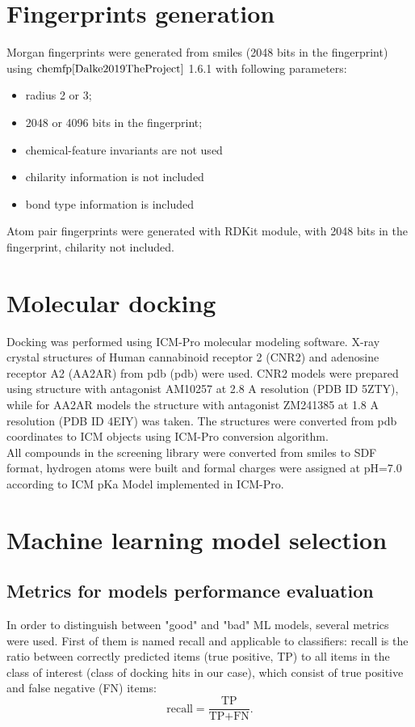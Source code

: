 \section{Fingerprints generation}

Morgan fingerprints were generated from \acrshort{smiles} (2048 bits in the fingerprint) 
using $\text{chemfp}{\cite{Dalke2019TheProject}}$ 1.6.1 with following parameters:
\begin{itemize}
    \item radius 2 or 3;
    \item 2048 or 4096 bits in the fingerprint;
    \item chemical-feature invariants are not used
    \item chilarity information is not included
    \item bond type information is included
\end{itemize}

Atom pair fingerprints were generated with RDKit module, with 2048 bits in the fingerprint, 
chilarity not included.

\section{Molecular docking}
Docking was performed using ICM-Pro molecular modeling software. %
X-ray crystal structures of Human cannabinoid receptor 2 (CNR2) and adenosine receptor 
A2 (AA2AR) from \acrlong{pdb} (\acrshort{pdb}) were used.
CNR2 models were prepared using structure with antagonist AM10257 at 2.8 A resolution 
(PDB ID 5ZTY), while for AA2AR models the structure with antagonist ZM241385 at 
1.8 A resolution (PDB ID 4EIY) was taken.
The structures were converted from \acrshort{pdb} coordinates to ICM objects using 
ICM-Pro conversion algorithm.\\

All compounds in the screening library were converted from \acrshort{smiles} to 
SDF format, hydrogen atoms were built and formal charges were assigned at pH=7.0 
according to ICM pKa Model implemented in ICM-Pro.

\section{Machine learning model selection}

\subsection{Metrics for models performance evaluation}
In order to distinguish between "good" and "bad" ML models, several metrics were 
used.
First of them is named recall and applicable to classifiers: recall is the ratio 
between correctly predicted items (true positive, TP) to all items in the class 
of interest (class of docking hits in our case), which consist of true positive 
and false negative (FN) items:
\begin{equation*}
    \text{recall} = \frac{\text{TP}}{\text{TP} + \text{FN}}.
\end{equation*}

